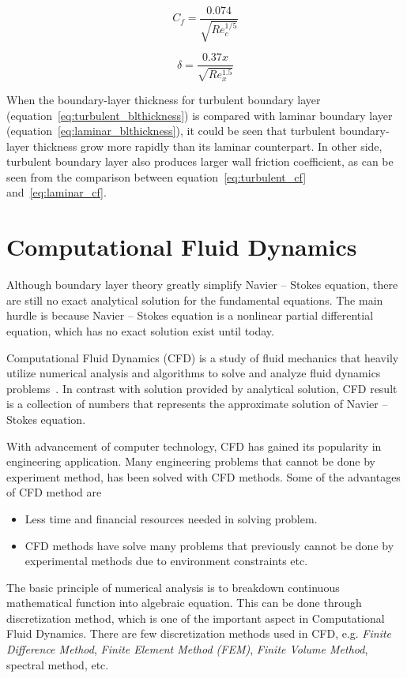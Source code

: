 \begin{equation} \label{eq:turbulent_cf}
  C_f = \frac{0.074}{\sqrt{Re_c^{1/5}}}
\end{equation}

\begin{equation} \label{eq:turbulent_blthickness}
  \delta = \frac{0.37x}{\sqrt{Re_x^{1.5}}}
\end{equation}

When the boundary-layer thickness for turbulent boundary layer (equation~\ref{eq:turbulent_blthickness}) is compared with laminar boundary layer (equation~\ref{eq:laminar_blthickness}), it could be seen that turbulent boundary-layer thickness grow more rapidly than its laminar counterpart. In other side, turbulent boundary layer also produces larger wall friction coefficient, as can be seen from the comparison between equation~\ref{eq:turbulent_cf} and~\ref{eq:laminar_cf}.

\section{Computational Fluid Dynamics}
Although boundary layer theory greatly simplify Navier -- Stokes equation, there are still no exact analytical solution for the fundamental equations. The main hurdle is because Navier -- Stokes equation is a nonlinear partial differential equation, which has no exact solution exist until today. 

Computational Fluid Dynamics (CFD) is a study of fluid mechanics that heavily utilize numerical analysis and algorithms to solve and analyze fluid dynamics problems~\cite{Wiki}. In contrast with solution provided by analytical solution, CFD result is a collection of numbers that represents the approximate solution of Navier -- Stokes equation. 

With advancement of computer technology, CFD has gained its popularity in engineering application. Many engineering problems that cannot be done by experiment method, has been solved with CFD methods. Some of the advantages of CFD method are 
\begin{itemize}
\item Less time and financial resources needed in solving problem.
\item CFD methods have solve many problems that previously cannot be done by
experimental methods due to environment constraints etc. 
\end{itemize} 

The basic principle of numerical analysis is to breakdown continuous mathematical function into algebraic equation. This can be done through discretization method, which is one of the important aspect in Computational Fluid Dynamics. There are few discretization methods used in CFD, e.g. \emph{Finite Difference Method}, \emph{Finite Element Method (FEM)}, \emph{Finite Volume Method}, spectral method, etc.

